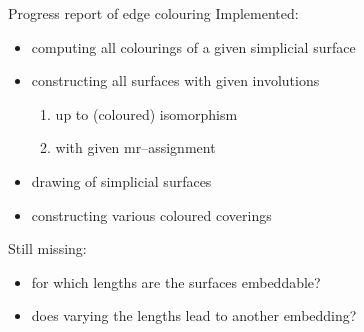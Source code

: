 \documentclass[11pt, handout]{beamer}
\begin{document}
\begin{frame}{Progress report of edge colouring}
    \pause
    Implemented:
    \begin{itemize}
        \pause
        \item computing all colourings of a given simplicial surface
        \pause
        \item constructing all surfaces with given involutions
            \begin{enumerate}
                \pause
                \item up to (coloured) isomorphism
                \pause
                \item with given mr--assignment
            \end{enumerate}
        \pause
        \item drawing of simplicial surfaces
        \pause
        \item constructing various coloured coverings
    \end{itemize}

    \pause
    Still missing:
    \begin{itemize}
        \pause
        \item for which lengths are the surfaces embeddable?
        \pause
        \item does varying the lengths lead to another embedding?
    \end{itemize}
\end{frame}
\end{document}
